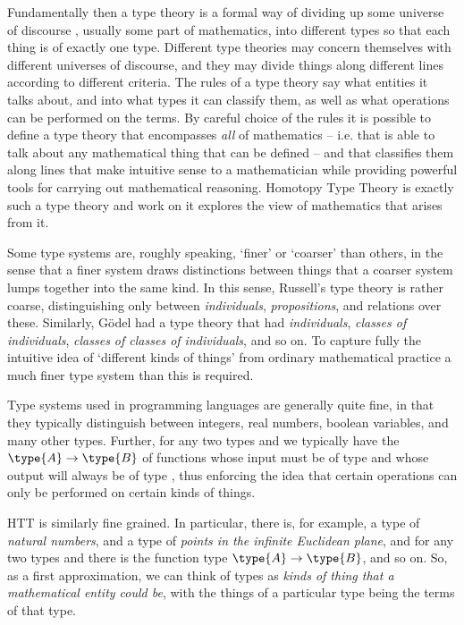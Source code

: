 Fundamentally then a type theory is a 
formal way of dividing up some universe of discourse
, usually some part of mathematics, into different types so that each thing is of exactly one type. 
Different type theories may concern themselves with different universes of discourse, and they may divide things along different lines according to different criteria.  
The rules of a type theory say what entities it talks about, and into what types it can classify them, as well as what operations can be performed on the terms.  
By careful choice of the rules it is possible to define a type theory that encompasses \emph{all} of mathematics -- i.e. that is able to talk about any mathematical thing that can be defined -- and that classifies them along lines that make intuitive sense to a mathematician while providing powerful tools for carrying out mathematical reasoning.  Homotopy Type Theory is exactly such a type theory and work on it explores the view of mathematics that arises from it.

Some type systems are, roughly speaking, `finer' or `coarser' than others, 
in the sense that a finer system draws distinctions between things that a coarser system lumps together into the same kind.  In this sense, Russell's type theory is rather coarse, distinguishing only between \emph{individuals}, \emph{propositions}, and relations over these. Similarly, G\"{o}del had a type theory that had \emph{individuals}, \emph{classes of individuals}, \emph{classes of classes of individuals}, and so on. To capture fully the intuitive idea of `different kinds of things' from ordinary mathematical practice a much finer type system than this is required.

Type systems used in programming languages are generally quite fine, in that they typically distinguish between integers, real numbers, boolean variables, and many other types.  Further, for any two types  and  we typically have the  $\type{A}\to\type{B}$ of functions whose input must be of type  and whose output will always be of type , thus enforcing the idea that certain operations can only be performed on certain kinds of things.

HTT is similarly fine grained. In particular, there is, for example, a type of \emph{natural numbers}, and a type of \emph{points in the infinite Euclidean plane}, and for any two types  and  there is the function type $\type{A}\to\type{B}$, and so on. So, as a first approximation, we can think of types as \emph{kinds of thing that a mathematical entity could be}, with the things of a particular type being the terms of that type.


